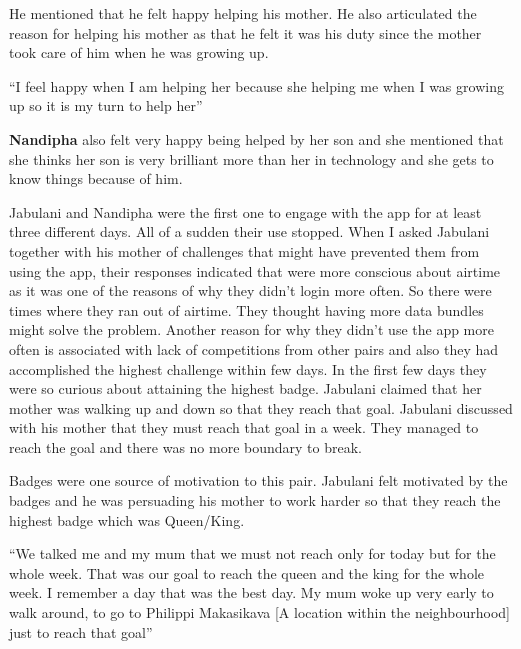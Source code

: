 He mentioned that he felt happy helping his mother. He also articulated the reason for helping his mother as that he felt it was his duty since the mother took care of him when he was growing up. 

 {``I feel happy when I am helping her because she helping me when I was growing up so it is my turn to help her''}

\textbf{Nandipha} also felt very happy being helped by her son and she mentioned that she thinks her son is very brilliant more than her in technology and she gets to know things because of him. 

Jabulani and Nandipha were the first one to engage with the app for at least three different days. All of a sudden their use stopped. When I asked Jabulani together with his mother of challenges that might have prevented them from using the app, their responses indicated that were more conscious about airtime as it was one of the reasons of why they didn't login more often. So there were times where they ran out of airtime. They thought having more data bundles might solve the problem. Another reason for why they didn't use the app more often is associated with lack of competitions from other pairs and also they had accomplished the highest challenge within few days. In the first few days they were so curious about attaining the highest badge. Jabulani claimed that her mother was walking up and down so that they reach that goal. Jabulani discussed with his mother that they must reach that goal in  a week. They managed to reach the goal and there was no more boundary to break.

Badges were one source of motivation to this pair. Jabulani felt motivated by the badges and he was persuading his mother to work harder so that they reach the highest badge which was Queen/King.

 {``We talked me and my mum that we must not reach only for today but for the whole week. That was our goal to reach the queen and the king for the whole week. I remember a day that was the best day. My mum woke up very early to walk around, to go to Philippi Makasikava [A location within the neighbourhood] just to reach that goal''}

